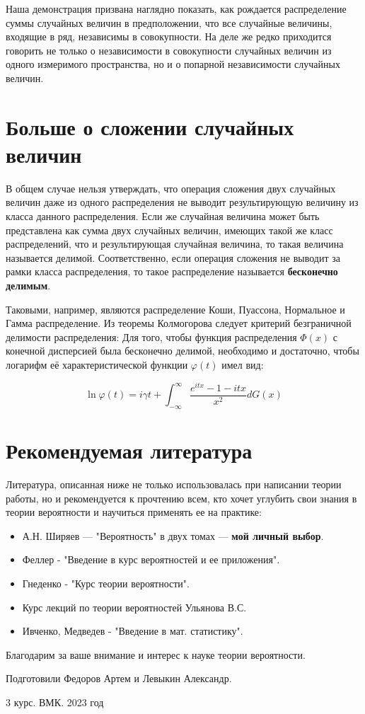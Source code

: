 \documentclass{article}
\begin{document}
\begin{multicols}{2}
    Наша демонстрация призвана наглядно показать, как рождается распределение суммы случайных величин в предположении, что все случайные величины, входящие в ряд, независимы в совокупности. На деле же редко приходится говорить не только о независимости в совокупности случайных величин из одного измеримого пространства, но и о попарной независимости случайных величин. 

\section{Больше о сложении случайных величин}
    В общем случае нельзя утверждать, что операция сложения двух случайных величин даже из одного распределения не выводит результирующую величину из класса данного распределения. Если же случайная величина может быть представлена как сумма двух случайных величин, имеющих такой же класс распределений, что и результирующая случайная величина, то такая величина называется делимой. Соответственно, если операция сложения не выводит за рамки класса распределения, то такое распределение называется \textbf{бесконечно делимым}.

    Таковыми, например, являются распределение Коши, Пуассона, Нормальное и Гамма распределение. Из теоремы Колмогорова следует критерий безграничной делимости распределения: Для того, чтобы функция распределения $\Phi(x)$ с конечной дисперсией была бесконечно делимой, необходимо и достаточно, чтобы логарифм её характеристической функции $\varphi(t)$ имел вид: 

    $$\ln \varphi(t)=i \gamma t+\int_{-\infty}^{\infty} \frac{e^{i t x}-1-i t x}{x^2} d G(x)$$

\section{Рекомендуемая литература}
    Литература, описанная ниже не только использовалась при написании теории работы, но и рекомендуется к прочтению всем, кто хочет углубить свои знания в теории вероятности и научиться применять ее на практике:

    \begin{itemize}
        \item А.Н. Ширяев — "Вероятность" в двух томах — \textbf{мой личный выбор}.
        \item Феллер - "Введение в курс вероятностей и ее приложения".
        \item Гнеденко - "Курс теории вероятности".
        \item Курс лекций по теории вероятностей Ульянова В.С. 
        \item Ивченко, Медведев - "Введение в мат. статистику".
    \end{itemize}
\end{multicols}

\begin{center}
    Благодарим за ваше внимание и интерес к науке теории вероятности.
    
    Подготовили Федоров Артем и Левыкин Александр.
    
    3 курс. ВМК. 2023 год
\end{center}
\end{document}
